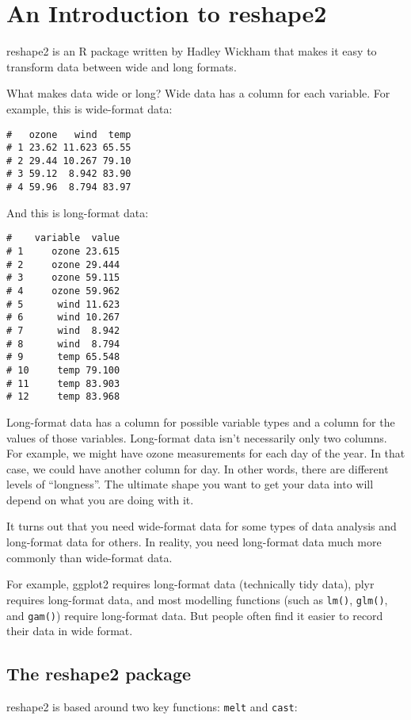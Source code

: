 \documentclass[french]{article}
\begin{document}
\section{An Introduction to reshape2}
reshape2 is an R package written by Hadley Wickham that makes it easy to transform data between wide and long formats.

What makes data wide or long?
Wide data has a column for each variable. For example, this is wide-format data:
\begin{framed}
\begin{verbatim}
#   ozone   wind  temp
# 1 23.62 11.623 65.55
# 2 29.44 10.267 79.10
# 3 59.12  8.942 83.90
# 4 59.96  8.794 83.97
\end{verbatim}
\end{framed}
And this is long-format data:
\begin{framed}
\begin{verbatim}
#    variable  value
# 1     ozone 23.615
# 2     ozone 29.444
# 3     ozone 59.115
# 4     ozone 59.962
# 5      wind 11.623
# 6      wind 10.267
# 7      wind  8.942
# 8      wind  8.794
# 9      temp 65.548
# 10     temp 79.100
# 11     temp 83.903
# 12     temp 83.968
\end{verbatim}
\end{framed}
Long-format data has a column for possible variable types and a column for the values of those variables. Long-format data isn’t necessarily only two columns. For example, we might have ozone measurements for each day of the year. In that case, we could have another column for day. In other words, there are different levels of “longness”. The ultimate shape you want to get your data into will depend on what you are doing with it.

It turns out that you need wide-format data for some types of data analysis and long-format data for others. In reality, you need long-format data much more commonly than wide-format data.

For example, ggplot2 requires long-format data (technically tidy data), plyr requires long-format data, and most modelling functions (such as \texttt{lm()}, \texttt{glm()}, and \texttt{gam()}) require long-format data. But people often find it easier to record their data in wide format.

\subsection{The reshape2 package}
reshape2 is based around two key functions: \texttt{melt} and \texttt{cast}:
\end{document}
